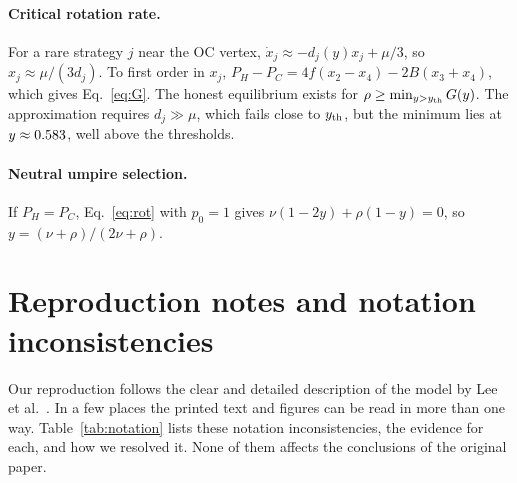 \documentclass[11pt]{article}
\begin{document}
\paragraph{Critical rotation rate.} For a rare strategy $j$ near the OC vertex,
$\dot x_j\approx -d_j(y)x_j+\mu/3$, so $x_j\approx\mu/(3d_j)$. To first order in $x_j$,
$P_H-P_C=4f(x_2-x_4)-2B(x_3+x_4)$, which gives Eq.~\eqref{eq:G}. The honest equilibrium exists for
$\rho\ge\min_{y>y_{\rm th}}G(y)$. The approximation requires $d_j\gg\mu$, which fails close to
$y_{\rm th}$, but the minimum lies at $y\approx0.583$, well above the thresholds.

\paragraph{Neutral umpire selection.} If $P_H=P_C$, Eq.~\eqref{eq:rot} with $p_0=1$ gives
$\nu(1-2y)+\rho(1-y)=0$, so $y=(\nu+\rho)/(2\nu+\rho)$.

\section{Reproduction notes and notation inconsistencies}\label{app:notes}

Our reproduction follows the clear and detailed description of the model by Lee et
al.~\cite{lee2019social}. In a few places the printed text and figures can be read in more than
one way. Table~\ref{tab:notation} lists these notation inconsistencies, the evidence for each, and
how we resolved it. None of them affects the conclusions of the original paper.
\end{document}
